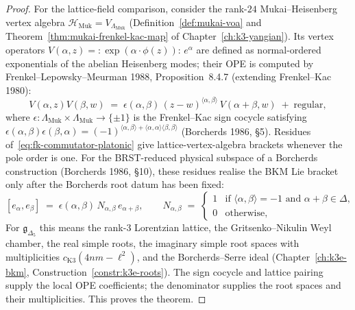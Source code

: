 \begin{proof}
For the lattice-field comparison, consider the rank-$24$ Mukai--Heisenberg
vertex algebra $\mathcal{H}_{\mathrm{Muk}} = V_{\Lambda_{\mathrm{Muk}}}$
(Definition~\ref{def:mukai-voa} and Theorem~\ref{thm:mukai-frenkel-kac-map} of
Chapter~\ref{ch:k3-yangian}). Its vertex operators
$V(\alpha,z) = {:}\exp(\alpha\cdot\phi(z)){:}\,e^\alpha$ are defined as
normal-ordered exponentials of the abelian Heisenberg modes; their OPE is
computed by Frenkel--Lepowsky--Meurman 1988, Proposition~8.4.7
(extending Frenkel--Kac 1980):
\begin{equation}
\label{eq:fk-commutator-platonic}
 V(\alpha,z)V(\beta,w)
 \;=\;
 \epsilon(\alpha,\beta)\,(z-w)^{\langle\alpha,\beta\rangle}\,
 V(\alpha+\beta, w)
 \;+\;
 \text{regular},
\end{equation}
where $\epsilon\colon
\Lambda_{\mathrm{Muk}}\times\Lambda_{\mathrm{Muk}}\to\{\pm 1\}$ is the
Frenkel--Kac sign cocycle satisfying
$\epsilon(\alpha,\beta)\epsilon(\beta,\alpha) =
(-1)^{\langle\alpha,\beta\rangle +
\langle\alpha,\alpha\rangle\langle\beta,\beta\rangle}$ (Borcherds 1986, §5).
Residues of~\eqref{eq:fk-commutator-platonic} give lattice-vertex-algebra
brackets whenever the pole order is one. For the BRST-reduced physical
subspace of a Borcherds construction (Borcherds 1986, §10), these residues
realise the BKM Lie bracket only after the Borcherds root datum has been
fixed:
\begin{equation}
\label{eq:bkm-bracket-from-fk}
 [e_\alpha, e_\beta]
 \;=\;
 \epsilon(\alpha,\beta)\, N_{\alpha,\beta}\, e_{\alpha+\beta},
 \qquad
 N_{\alpha,\beta}
 \;=\;
 \begin{cases}
 1 & \text{if }\langle\alpha,\beta\rangle = -1\text{ and }\alpha+\beta\in\Delta,\\
 0 & \text{otherwise},
 \end{cases}
\end{equation}
For $\mathfrak{g}_{\Delta_5}$ this means the rank-$3$ Lorentzian lattice,
the Gritsenko--Nikulin Weyl chamber, the real simple roots, the imaginary
simple root spaces with multiplicities
$c_{\mathrm{K3}}(4nm-\ell^2)$, and the Borcherds--Serre ideal
(Chapter~\ref{ch:k3e-bkm}, Construction~\ref{constr:k3e-roots}). The sign
cocycle and lattice pairing supply the local OPE coefficients; the
denominator supplies the root spaces and their multiplicities. This proves
the theorem.
\end{proof}

